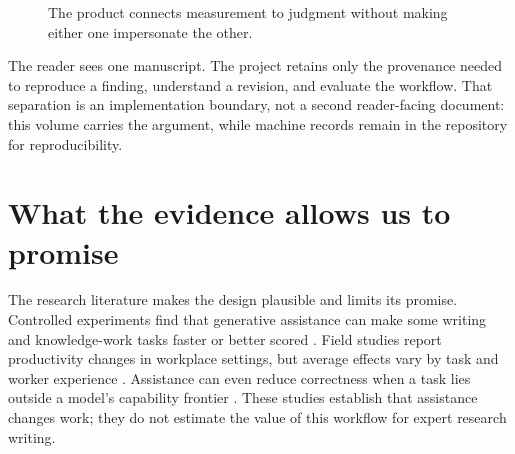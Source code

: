 \begin{figure}[H]
\centering
{}
\caption{The product connects measurement to judgment without making either one impersonate the other.}
\label{fig:opening-journey}
\end{figure}

The reader sees one manuscript. The project retains only the provenance needed
to reproduce a finding, understand a revision, and evaluate the workflow. That
separation is an implementation boundary, not a second reader-facing
document: this volume carries the argument, while machine records remain in
the repository for reproducibility.

\section{What the evidence allows us to promise}

The research literature makes the design plausible and limits its promise.
Controlled experiments find that generative assistance can make some writing
and knowledge-work tasks faster or better scored \citep{noy2023experimental}.
Field studies report productivity changes in workplace settings, but average
effects vary by task and worker experience \citep{dillon2025shifting,brynjolfsson2025work}.
Assistance can even reduce correctness when a task lies outside a model's
capability frontier \citep{dellacqua2026jagged}. These studies establish that
assistance changes work; they do not estimate the value of this workflow for
expert research writing.

